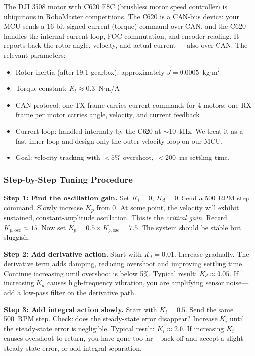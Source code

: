 The DJI 3508 motor with C620 ESC (brushless motor speed controller) is ubiquitous in RoboMaster competitions. The C620 is a CAN-bus device: your MCU sends a 16-bit signed current (torque) command over CAN, and the C620 handles the internal current loop, FOC commutation, and encoder reading. It reports back the rotor angle, velocity, and actual current --- also over CAN. The relevant parameters:
\begin{itemize}
    \item Rotor inertia (after 19:1 gearbox): approximately $J = 0.0005$~kg$\cdot$m$^2$
    \item Torque constant: $K_t \approx 0.3$~N$\cdot$m/A
    \item CAN protocol: one TX frame carries current commands for 4 motors; one RX frame per motor carries angle, velocity, and current feedback
    \item Current loop: handled internally by the C620 at $\sim$10~kHz. We treat it as a fast inner loop and design only the outer velocity loop on our MCU.
    \item Goal: velocity tracking with $<5\%$ overshoot, $<200$~ms settling time.
\end{itemize}

\subsubsection{Step-by-Step Tuning Procedure}

\textbf{Step 1: Find the oscillation gain.} Set $K_i = 0$, $K_d = 0$. Send a 500~RPM step command. Slowly increase $K_p$ from 0. At some point, the velocity will exhibit sustained, constant-amplitude oscillation. This is the \textit{critical gain}. Record $K_{p,\text{osc}} \approx 15$. Now set $K_p = 0.5 \times K_{p,\text{osc}} = 7.5$. The system should be stable but sluggish.

\textbf{Step 2: Add derivative action.} Start with $K_d = 0.01$. Increase gradually. The derivative term adds damping, reducing overshoot and improving settling time. Continue increasing until overshoot is below 5\%. Typical result: $K_d \approx 0.05$. If increasing $K_d$ causes high-frequency vibration, you are amplifying sensor noise---add a low-pass filter on the derivative path.

\textbf{Step 3: Add integral action slowly.} Start with $K_i = 0.5$. Send the same 500~RPM step. Check: does the steady-state error disappear? Increase $K_i$ until the steady-state error is negligible. Typical result: $K_i \approx 2.0$. If increasing $K_i$ causes overshoot to return, you have gone too far---back off and accept a slight steady-state error, or add integral separation.

